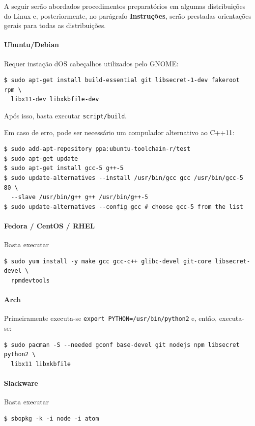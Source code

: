 	A seguir serão abordados procedimentos preparatórios em algumas distribuições do Linux e, posteriormente, no parágrafo \textbf{Instruções}, serão prestadas orientações gerais para todas as distribuições.

	\paragraph{Ubuntu/Debian}
	Requer instação dOS cabeçalhos utilizados pelo GNOME:
\begin{Verbatim}[fontsize=\footnotesize]
$ sudo apt-get install build-essential git libsecret-1-dev fakeroot rpm \
  libx11-dev libxkbfile-dev
\end{Verbatim}
	Após isso, basta executar \verb|script/build|.

	Em caso de erro, pode ser necessário um compulador alternativo ao C++11:
\begin{Verbatim}[fontsize=\footnotesize]
$ sudo add-apt-repository ppa:ubuntu-toolchain-r/test
$ sudo apt-get update
$ sudo apt-get install gcc-5 g++-5
$ sudo update-alternatives --install /usr/bin/gcc gcc /usr/bin/gcc-5 80 \
  --slave /usr/bin/g++ g++ /usr/bin/g++-5
$ sudo update-alternatives --config gcc # choose gcc-5 from the list
\end{Verbatim}

	\paragraph{Fedora / CentOS / RHEL}
	Basta executar
	\begin{Verbatim}[fontsize=\footnotesize]
$ sudo yum install -y make gcc gcc-c++ glibc-devel git-core libsecret-devel \
  rpmdevtools
	\end{Verbatim}

	\paragraph{Arch}
	Primeiramente executa-se \verb|export PYTHON=/usr/bin/python2| e, então, executa-se:
	\begin{Verbatim}[fontsize=\footnotesize]
$ sudo pacman -S --needed gconf base-devel git nodejs npm libsecret python2 \
  libx11 libxkbfile
	\end{Verbatim}

	\paragraph{Slackware}
	Basta executar
	\begin{Verbatim}[fontsize=\footnotesize]
$ sbopkg -k -i node -i atom
	\end{Verbatim}

